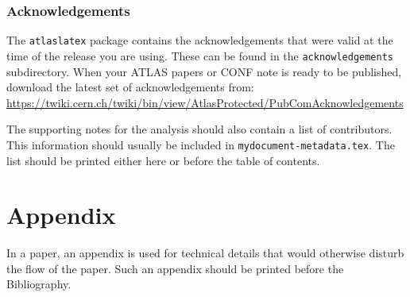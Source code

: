 \documentclass[UKenglish,texlive=2013]{\ATLASLATEXPATH atlasdoc}
\begin{document}
\section*{Acknowledgements}

%

The \texttt{atlaslatex} package contains the acknowledgements that were valid 
at the time of the release you are using. These can be found in the
\texttt{acknowledgements} subdirectory.
When your ATLAS papers or CONF note is ready to be published,
download the latest set of acknowledgements from:\\
\url{https://twiki.cern.ch/twiki/bin/view/AtlasProtected/PubComAcknowledgements}

The supporting notes for the analysis should also contain a list of contributors.
This information should usually be included in \texttt{mydocument-metadata.tex}.
The list should be printed either here or before the table of contents.


\clearpage
\appendix
\part*{Appendix}

In a paper, an appendix is used for technical details that would otherwise disturb the flow of the paper.
Such an appendix should be printed before the Bibliography.


\printbibliography
%
%

\clearpage
{}
\end{document}
